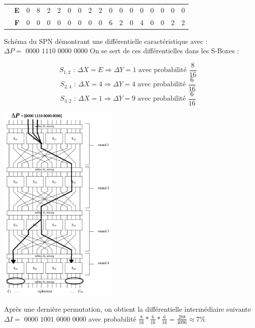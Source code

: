 \documentclass[fleqn]{article}
\begin{document}
\begin{table}[H]
\begin{tabular}{c|c|c|c|c|c|c|c|c|c|c|c|c|c|c|c|c|c|}
\multicolumn{1}{|c|}{}                                      & \textbf{E} & 0          & 8          & 2          & 2          & 0          & 0          & 2          & 2          & 0          & 0          & 0          & 0          & 0          & 0          & 0          & 0          \\ \cline{2-18} 
\multicolumn{1}{|c|}{}                                      & \textbf{F} & 0          & 0          & 0          & 0          & 0          & 0          & 0          & 0          & 6          & 2          & 0          & 4          & 0          & 0          & 2          & 2          \\ \hline
\end{tabular}
\end{table}


Schéma du SPN démontrant une différentielle caractéristique avec :
$\boxed{\Delta P = \text{ 0000 1110 0000 0000}}$\newline\newline
On se sert de ces différentielles dans les S-Boxes :

\[S_{1,2} \text{ : } \Delta X = E \Rightarrow \Delta Y = 1 \text{       avec probabilité } \frac{8}{16}\]
\[S_{2,4} \text{ : } \Delta X = 4 \Rightarrow \Delta Y = 4 \text{       avec probabilité } \frac{6}{16}\]
\[S_{3,2} \text{ : } \Delta X = 1 \Rightarrow \Delta Y = 9 \text{       avec probabilité } \frac{6}{16}\]

\begin{minipage}[c]{\textwidth}
\centering
\includegraphics[width=220px]{SPN-Differential}

\end{minipage}
\newline\newline
\noindent
Après une dernière permutation, on obtient la différentielle intermédiaire suivante $\boxed{\Delta I = \text{ 0000 1001 0000 0000}}$ avec probabilité $\frac{8}{16} * \frac{6}{16} * \frac{6}{16} = \frac{288}{4096} \approx 7\%$
\end{document}
